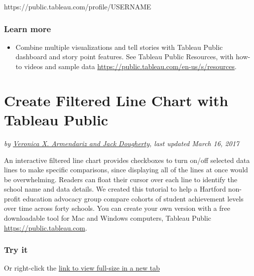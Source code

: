 \documentclass[
  english,
]{book}
\newenvironment{Shaded}{\begin{snugshade}}{\end{snugshade}}
\newcommand{\NormalTok}[1]{#1}
\providecommand{\tightlist}{%
  \setlength{\itemsep}{0pt}\setlength{\parskip}{0pt}}
\begin{document}
\begin{Shaded}
\begin{Highlighting}[]
\NormalTok{https://public.tableau.com/profile/USERNAME}
\end{Highlighting}
\end{Shaded}

\hypertarget{learn-more-9}{%
\subsubsection*{Learn more}\label{learn-more-9}}

\begin{itemize}
\tightlist
\item
  Combine multiple visualizations and tell stories with Tableau Public dashboard and story point features. See Tableau Public Resources, with how-to videos and sample data \url{https://public.tableau.com/en-us/s/resources}.
\end{itemize}

\hypertarget{filtered-line-chart-tableau}{%
\section{Create Filtered Line Chart with Tableau Public}\label{filtered-line-chart-tableau}}

\emph{by \href{authors}{Veronica X. Armendariz and Jack Dougherty}, last updated March 16, 2017}

An interactive filtered line chart provides checkboxes to turn on/off selected data lines to make specific comparisons, since displaying all of the lines at once would be overwhelming. Readers can float their cursor over each line to identify the school name and data details. We created this tutorial to help a Hartford non-profit education advocacy group compare cohorts of student achievement levels over time across forty schools. You can create your own version with a free downloadable tool for Mac and Windows computers, Tableau Public \url{https://public.tableau.com}.

\hypertarget{try-it-1}{%
\subsubsection*{Try it}\label{try-it-1}}

Or right-click the \href{https://public.tableau.com/views/LineChartSample/Sheet1?:embed=y\&:display_count=yes}{link to view full-size in a new tab}
\end{document}
